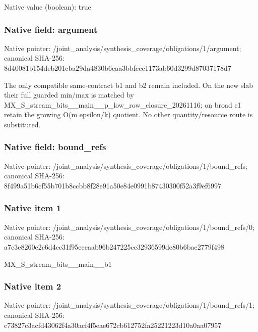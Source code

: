 \documentclass[10pt,a4paper]{article}
\begin{document}
Native value (boolean): true

\subsubsection{Native field: argument}
Native pointer: /joint\_\allowbreak{}analysis/synthesis\_\allowbreak{}coverage/obligations/1/argument; canonical SHA-256: 8d40081b154deb201cba29da4830b6caa3bbfece1173ab60d3299d87037178d7

\begingroup\raggedright\sloppy The only compatible same-contract b1 and b2 remain included. On the new slab their full guarded min/\allowbreak{}max is matched by MX\_\allowbreak{}S\_\allowbreak{}stream\_\allowbreak{}bits\_\allowbreak{}\_\allowbreak{}main\_\allowbreak{}\_\allowbreak{}p\_\allowbreak{}low\_\allowbreak{}row\_\allowbreak{}closure\_\allowbreak{}20261116;\allowbreak{} on broad c1 retain the growing O(m epsilon/\allowbreak{}k) quotient. No other quantity/\allowbreak{}resource route is substituted.\par\endgroup

\subsubsection{Native field: bound\_\allowbreak{}refs}
Native pointer: /joint\_\allowbreak{}analysis/synthesis\_\allowbreak{}coverage/obligations/1/bound\_\allowbreak{}refs; canonical SHA-256: 8f499a51b6cf55b701b8ccbb8f28e91a50e84e0991b87430300f52a3f9ef6997

\subsubsection{Native item 1}
Native pointer: /joint\_\allowbreak{}analysis/synthesis\_\allowbreak{}coverage/obligations/1/bound\_\allowbreak{}refs/0; canonical SHA-256: a7c3e8260e2c6d4cc31f95eeeaab96b247225cc32936599de80b6bae2779f498

\begingroup\raggedright\sloppy MX\_\allowbreak{}S\_\allowbreak{}stream\_\allowbreak{}bits\_\allowbreak{}\_\allowbreak{}main\_\allowbreak{}\_\allowbreak{}b1\par\endgroup

\subsubsection{Native item 2}
Native pointer: /joint\_\allowbreak{}analysis/synthesis\_\allowbreak{}coverage/obligations/1/bound\_\allowbreak{}refs/1; canonical SHA-256: c73827c3acfd43062f4a30acf4f5eae672cb612752fa25221223d10a0aa07957
\end{document}
